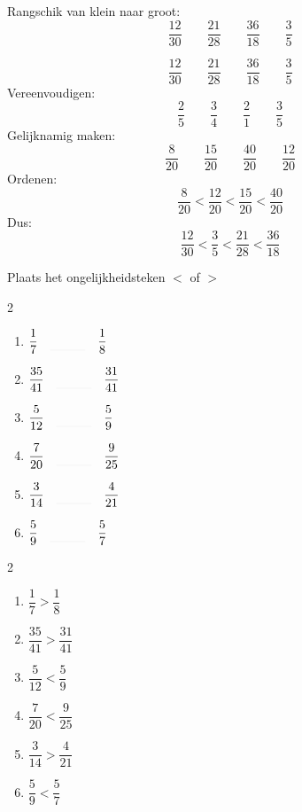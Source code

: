 \documentclass{bis}
\begin{document}
\begin{exercise}
Rangschik van klein naar groot:
\[\dfrac{12}{30} \qquad \dfrac{21}{28} \qquad \dfrac{36}{18} \qquad \dfrac{3}{5}\]
\end{exercise}

\begin{solution}
\[\dfrac{12}{30} \qquad \dfrac{21}{28} \qquad \dfrac{36}{18} \qquad \dfrac{3}{5}\]
Vereenvoudigen:
\[\dfrac{2}{5} \qquad \dfrac{3}{4} \qquad \dfrac{2}{1} \qquad \dfrac{3}{5}\]
Gelijknamig maken:
\[\dfrac{8}{20} \qquad \dfrac{15}{20} \qquad \dfrac{40}{20} \qquad \dfrac{12}{20}\]
Ordenen:
\[\dfrac{8}{20}  < \dfrac{12}{20} < \dfrac{15}{20} < \dfrac{40}{20}\]
Dus:
\[\dfrac{12}{30}  < \dfrac{3}{5} < \dfrac{21}{28} < \dfrac{36}{18}\]
\end{solution}

\begin{exercise}
Plaats het ongelijkheidsteken $<$ of $>$
\begin{multicols}{2}
\begin{enumerate}
  \item $\dfrac{1}{7} \quad\arule{1cm}\quad \dfrac{1}{8}$
  \item $\dfrac{35}{41} \quad\arule{1cm}\quad \dfrac{31}{41}$
  \item $\dfrac{5}{12} \quad\arule{1cm}\quad \dfrac{5}{9}$
  \item $\dfrac{7}{20} \quad\arule{1cm}\quad \dfrac{9}{25}$
  \item $\dfrac{3}{14} \quad\arule{1cm}\quad \dfrac{4}{21}$
  \item $\dfrac{5}{9} \quad\arule{1cm}\quad \dfrac{5}{7}$
\end{enumerate}
\end{multicols}
\end{exercise}

\begin{solution}
\begin{multicols}{2}
\begin{enumerate}
  \item $\dfrac{1}{7} > \dfrac{1}{8}$
  \item $\dfrac{35}{41} > \dfrac{31}{41}$
  \item $\dfrac{5}{12} < \dfrac{5}{9}$
  \item $\dfrac{7}{20} < \dfrac{9}{25}$
  \item $\dfrac{3}{14} > \dfrac{4}{21}$
  \item $\dfrac{5}{9} < \dfrac{5}{7}$
\end{enumerate}
\end{multicols}
\end{solution}
\end{document}
